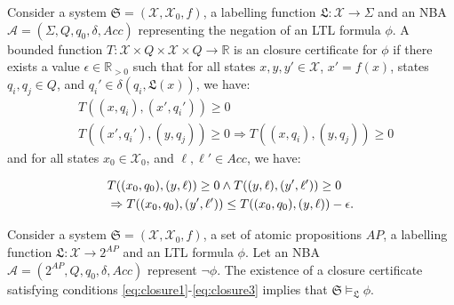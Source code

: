 \begin{definition}
\label{LTLCC}
Consider a system $\mathfrak{S} = (\mathcal{X}, \mathcal{X}_0, f)$, a labelling function $\mathfrak{L} : \mathcal{X} \rightarrow \Sigma$ and an NBA $\mathcal{A} = (\Sigma, Q, q_0, \delta, Acc)$ representing the negation of an LTL formula $\phi$. A bounded function $T : \mathcal{X} \times Q \times \mathcal{X} \times Q \rightarrow \mathbb{R}$ is an closure certificate for $\phi$ if there exists a value $\epsilon \in \mathbb{R}_{> 0}$ such that for all states $x, y, y' \in \mathcal{X}$, $x' = f(x)$, states $q_i, q_j \in Q$, and $q_i' \in \delta(q_i, \mathfrak{L}(x))$, we have:
\begin{align}
    &T((x, q_i), (x', q_i')) \geq 0 \label{eq:closure1} \\
    &T((x', q_i'), (y, q_j)) \geq 0 \Rightarrow T((x, q_i), (y, q_j)) \geq 0 \label{eq:closure2}
\end{align}
and for all states $x_0 \in \mathcal{X}_0$, and $\ell, \ell' \in Acc$, we have:

\begin{align}
  & T((x_0, q_0), (y, \ell)) \geq 0 \land T((y, \ell), (y', \ell')) \geq 0 \notag \\
  &\Rightarrow T((x_0, q_0), (y', \ell')) \leq T((x_0, q_0), (y, \ell)) - \epsilon. \label{eq:closure3}
\end{align}
\end{definition}

\begin{theorem}[LTL]
Consider a system $\mathfrak{S}=(\mathcal{X}, \mathcal{X}_0, f)$, a set of atomic propositions $AP$, a labelling function $\mathfrak{L}: \mathcal{X} \rightarrow 2^{AP}$ and an LTL formula $\phi$. Let an NBA $\mathcal{A} = (2^{AP}, Q, q_0, \delta, Acc)$ represent $\neg \phi$. The existence of a closure certificate satisfying conditions \eqref{eq:closure1}-\eqref{eq:closure3} implies that $\mathfrak{S} \models_\mathfrak{L} \phi$.
\end{theorem}



